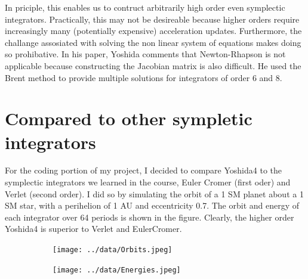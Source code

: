 \documentclass[12pt, letterpaper]{article}
\begin{document}
In priciple, this enables us to contruct arbitrarily high order even symplectic
integrators. Practically, this may not be desireable because higher orders
require increasingly many (potentially expensive) acceleration updates.
Furthermore, the challange assosiated with solving the non linear system of
equations makes doing so prohibative. In his paper, Yoshida comments that
Newton-Rhapson is not applicable because constructing the Jacobian matrix is
also difficult. He used the Brent method to provide multiple solutions for
integrators of order 6 and 8.

\section{Compared to other sympletic integrators}
For the coding portion of my project, I decided to compare Yoshida4 to the
symplectic integrators we learned in the course, Euler Cromer (first oder) and
Verlet (second order). I did so by simulating the orbit of a 1 SM planet about
a 1 SM star, with a perihelion of 1 AU and eccentricity 0.7.
The orbit and energy of each integrator over 64 periods is shown in the figure.
Clearly, the higher order Yoshida4 is superior to Verlet and EulerCromer.

\begin{figure}[h]
  \centering
  \caption{Comparison of integration schemes}
  \begin{subfigure}{0.475\textwidth}
    \texttt{[image: ../data/Orbits.jpeg]}
  \end{subfigure} \hfill \begin{subfigure}{0.475\textwidth}
    \texttt{[image: ../data/Energies.jpeg]}
  \end{subfigure}
\end{figure}
\end{document}
